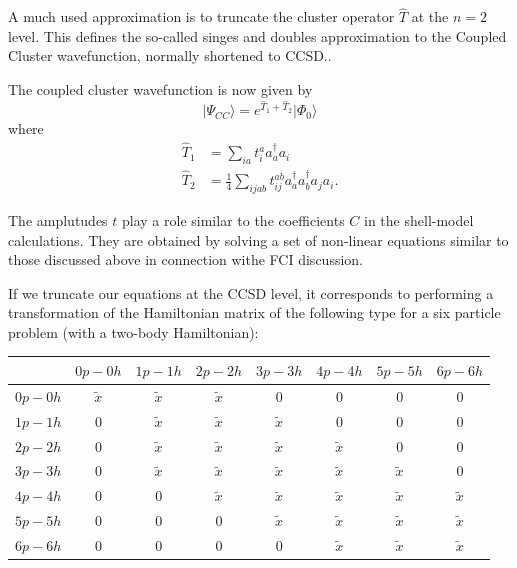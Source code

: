 A much used approximation is to  truncate the cluster operator $\hat{T}$ at the $n=2$ level. This defines the so-called singes and doubles approximation to the Coupled Cluster wavefunction, normally shortened to CCSD..

The coupled cluster wavefunction is now given by
\begin{equation*}
            \vert \Psi_{CC}\rangle = e^{\hat{T}_1 + \hat{T}_2} \vert \Phi_0\rangle
\end{equation*}
where 
        \begin{align*}
            \hat{T}_1 &= 
            \sum_{ia}
                t_{i}^{a} a_{a}^\dagger a_i \\
            \hat{T}_2 &= \frac{1}{4} 
            \sum_{ijab}
                t_{ij}^{ab} a_{a}^\dagger a_{b}^\dagger a_{j} a_{i}.
        \end{align*}

The amplutudes $t$ play a role similar to the coefficients $C$ in the shell-model calculations. They are obtained by solving a set of non-linear equations
similar to those discussed above in connection withe FCI discussion.

If we truncate our equations at the CCSD level, it corresponds to performing a transformation of the Hamiltonian matrix of the following type for a six particle problem (with a two-body Hamiltonian):

\begin{table}
\begin{center}
\begin{tabular}{cccccccc}
\hline
\multicolumn{1}{c}{  } & \multicolumn{1}{c}{ $0p-0h$ } & \multicolumn{1}{c}{ $1p-1h$ } & \multicolumn{1}{c}{ $2p-2h$ } & \multicolumn{1}{c}{ $3p-3h$ } & \multicolumn{1}{c}{ $4p-4h$ } & \multicolumn{1}{c}{ $5p-5h$ } & \multicolumn{1}{c}{ $6p-6h$ } \\
\hline
$0p-0h$ & $\tilde{x}$ & $\tilde{x}$ & $\tilde{x}$ & 0           & 0           & 0           & 0           \\
$1p-1h$ & 0           & $\tilde{x}$ & $\tilde{x}$ & $\tilde{x}$ & 0           & 0           & 0           \\
$2p-2h$ & 0           & $\tilde{x}$ & $\tilde{x}$ & $\tilde{x}$ & $\tilde{x}$ & 0           & 0           \\
$3p-3h$ & 0           & $\tilde{x}$ & $\tilde{x}$ & $\tilde{x}$ & $\tilde{x}$ & $\tilde{x}$ & 0           \\
$4p-4h$ & 0           & 0           & $\tilde{x}$ & $\tilde{x}$ & $\tilde{x}$ & $\tilde{x}$ & $\tilde{x}$ \\
$5p-5h$ & 0           & 0           & 0           & $\tilde{x}$ & $\tilde{x}$ & $\tilde{x}$ & $\tilde{x}$ \\
$6p-6h$ & 0           & 0           & 0           & 0           & $\tilde{x}$ & $\tilde{x}$ & $\tilde{x}$ \\
\hline
\end{tabular}
\end{center}
\end{table}

